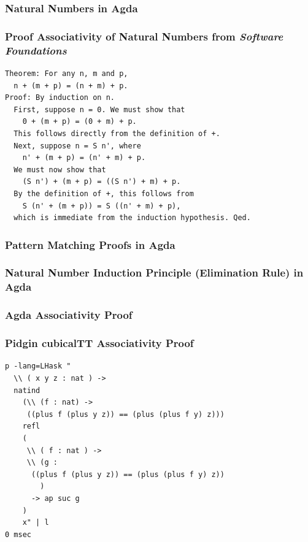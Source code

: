 \documentclass[9pt]{beamer}
\begin{document}
\begin{frame}
\frametitle{Natural Numbers in Agda}
% 
\end{frame}

\begin{frame}[fragile]
\frametitle{Proof Associativity of Natural Numbers from \emph{Software Foundations}}
\begin{verbatim}
Theorem: For any n, m and p,
  n + (m + p) = (n + m) + p.
Proof: By induction on n.
  First, suppose n = 0. We must show that
    0 + (m + p) = (0 + m) + p.
  This follows directly from the definition of +.
  Next, suppose n = S n', where
    n' + (m + p) = (n' + m) + p.
  We must now show that
    (S n') + (m + p) = ((S n') + m) + p.
  By the definition of +, this follows from
    S (n' + (m + p)) = S ((n' + m) + p),
  which is immediate from the induction hypothesis. Qed.
\end{verbatim}
\end{frame}

\begin{frame}
\frametitle{Pattern Matching Proofs in Agda}

% 

\end{frame}

\begin{frame}

\frametitle{Natural Number Induction Principle (Elimination Rule) in Agda}
% 

\end{frame}

\begin{frame}
\frametitle{Agda Associativity Proof}
% 

\end{frame}


\begin{frame}[fragile]
\frametitle{Pidgin cubicalTT Associativity Proof}

\begin{verbatim}
p -lang=LHask "
  \\ ( x y z : nat ) -> 
  natind 
    (\\ (f : nat) -> 
     ((plus f (plus y z)) == (plus (plus f y) z))) 
    refl 
    ( 
     \\ ( f : nat ) -> 
     \\ (g : 
      ((plus f (plus y z)) == (plus (plus f y) z))
        ) 
      -> ap suc g  
    ) 
    x" | l
0 msec

\end{verbatim}

\end{frame}
\end{document}
